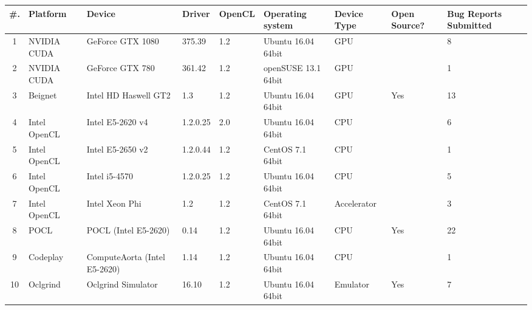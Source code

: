 \begin{tabular}{ cllllllR{1cm} | R{1.6cm} }
  \toprule
  \textbf{\#. } & \textbf{Platform} & \textbf{Device} & \textbf{Driver} & \textbf{OpenCL} &
  \textbf{Operating system} & \textbf{Device Type} & \textbf{Open Source?} & \textbf{Bug Reports Submitted} \\
   & NVIDIA CUDA & GeForce GTX 1080 & 375.39 & 1.2 & Ubuntu 16.04 64bit & GPU & & 8 \\
  2 & NVIDIA CUDA & GeForce GTX 780 & 361.42 & 1.2 & openSUSE 13.1 64bit & GPU & & 1 \\
  3 & Beignet & Intel HD Haswell GT2 & 1.3 & 1.2 & Ubuntu 16.04 64bit & GPU & Yes & 13 \\
  4 & Intel OpenCL & Intel E5-2620 v4 & 1.2.0.25 & 2.0 & Ubuntu 16.04 64bit & CPU & & 6 \\
  5 & Intel OpenCL & Intel E5-2650 v2 & 1.2.0.44 & 1.2 & CentOS 7.1 64bit & CPU & & 1 \\
  6 & Intel OpenCL & Intel i5-4570 & 1.2.0.25 & 1.2 & Ubuntu 16.04 64bit & CPU & & 5 \\
  7 & Intel OpenCL & Intel Xeon Phi & 1.2 & 1.2 & CentOS 7.1 64bit & Accelerator & & 3 \\
  8 & POCL & POCL (Intel E5-2620) & 0.14 & 1.2 & Ubuntu 16.04 64bit & CPU & Yes & 22 \\
  9 & Codeplay & ComputeAorta (Intel E5-2620) & 1.14 & 1.2 & Ubuntu 16.04 64bit & CPU & & 1 \\
  10 & Oclgrind & Oclgrind Simulator & 16.10 & 1.2 & Ubuntu 16.04 64bit & Emulator & Yes & 7 \\

  \bottomrule
\end{tabular}

